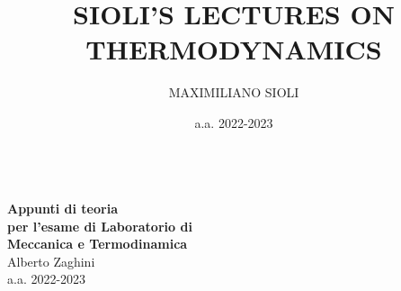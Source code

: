 \documentclass[10pt, oneside]{book}
\title{SIOLI'S LECTURES ON THERMODYNAMICS}
\author{MAXIMILIANO SIOLI}
\date{a.a. 2022-2023}
\begin{document}
\makeatletter
\begin{titlepage}
\vspace{-2.1cm}
\hspace{0cm}
\vfill
\, \\\larger[20]\textsf{\textbf{Appunti di teoria \\per l'esame di Laboratorio di \\Meccanica e Termodinamica}}
\\\smaller[2]Alberto Zaghini
\\a.a. 2022-2023
\\~\\ \larger[20]\,\,
\\~\\ \,\,

\vfill
\hspace{0cm}
\end{titlepage}
\makeatother
\end{document}
